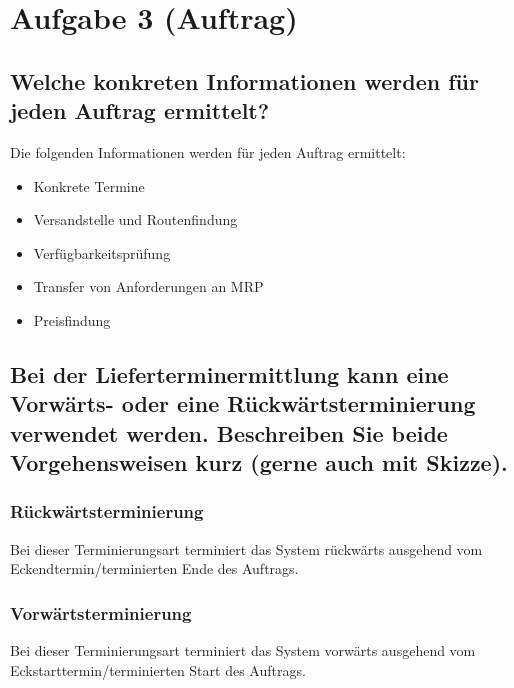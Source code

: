\section{Aufgabe 3 (Auftrag)}
\subsection{Welche konkreten Informationen werden für jeden Auftrag ermittelt?}

Die folgenden Informationen werden für jeden Auftrag ermittelt:
\begin{itemize}
  \item Konkrete Termine
  \item Versandstelle und Routenfindung
  \item Verfügbarkeitsprüfung
  \item Transfer von Anforderungen an MRP
  \item Preisfindung
\end{itemize}


\subsection{Bei der Lieferterminermittlung kann eine Vorwärts- oder eine
Rückwärtsterminierung verwendet werden. Beschreiben Sie beide Vorgehensweisen kurz (gerne auch mit Skizze).}

\subsubsection{Rückwärtsterminierung}
Bei dieser Terminierungsart terminiert das System rückwärts ausgehend vom
Eckendtermin/terminierten Ende des Auftrags.
\begin{center}
\end{center}

\subsubsection{Vorwärtsterminierung}
Bei dieser Terminierungsart terminiert das System vorwärts ausgehend vom Eckstarttermin/terminierten Start des Auftrags.
\begin{center}
\end{center}
\clearpage